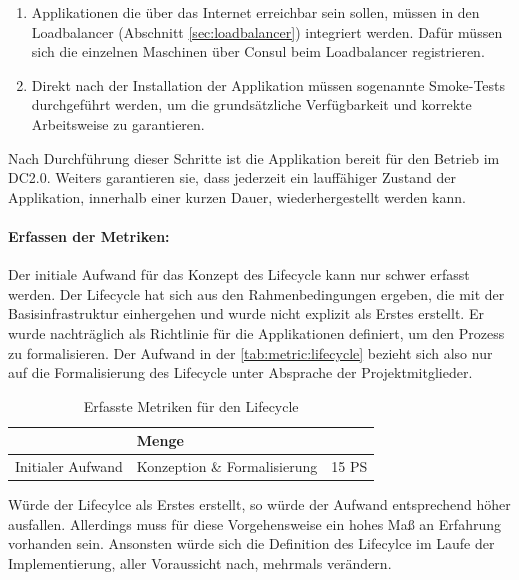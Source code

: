 \begin{enumerate}
	\item Applikationen die über das Internet erreichbar sein sollen, müssen in den Loadbalancer (Abschnitt \ref{sec:loadbalancer}) integriert werden. Dafür müssen sich die einzelnen Maschinen über Consul beim Loadbalancer registrieren.
	\item Direkt nach der Installation der Applikation müssen sogenannte Smoke-Tests durchgeführt werden, um die grundsätzliche Verfügbarkeit und korrekte Arbeitsweise zu garantieren.
\end{enumerate}

Nach Durchführung dieser Schritte ist die Applikation bereit für den Betrieb im DC2.0. Weiters garantieren sie, dass jederzeit ein lauffähiger Zustand der Applikation, innerhalb einer kurzen Dauer, wiederhergestellt werden kann.

\paragraph{Erfassen der Metriken:}
Der initiale Aufwand für das Konzept des Lifecycle kann nur schwer erfasst werden. Der Lifecycle hat sich aus den Rahmenbedingungen ergeben, die mit der Basisinfrastruktur einhergehen und wurde nicht explizit als Erstes erstellt. Er wurde nachträglich als Richtlinie für die Applikationen definiert, um den Prozess zu formalisieren. Der Aufwand in der \autoref{tab:metric:lifecycle} bezieht sich also nur auf die Formalisierung des Lifecycle unter Absprache der Projektmitglieder.

\begin{table}[ht]
\setlength{\tabcolsep}{5pt}
\renewcommand{\arraystretch}{1.5}
\centering
\begin{tabular}{|l|l|l|}
\hline
\rowcolor[HTML]{C0C0C0}
\multicolumn{2}{|c|}{\textbf{Metrik}} 		& \textbf{Menge}		\\ 
\hline
Initialer Aufwand			& Konzeption	 \& Formalisierung 	& 15 PS				\\ 
\hline
\end{tabular}
\caption{Erfasste Metriken für den Lifecycle}
\label{tab:metric:lifecycle}
\end{table}

Würde der Lifecylce als Erstes erstellt, so würde der Aufwand entsprechend höher ausfallen. Allerdings muss für diese Vorgehensweise ein hohes Maß an Erfahrung vorhanden sein. Ansonsten würde sich die Definition des Lifecylce im Laufe der Implementierung, aller Voraussicht nach, mehrmals verändern.

